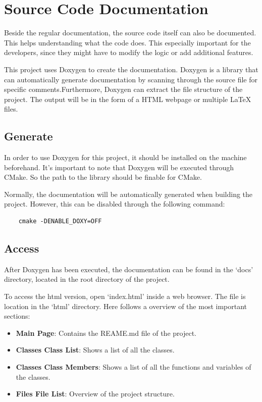 \documentclass[]{article}
\begin{document}
\section{Source Code Documentation}
Beside the regular documentation, the source code itself can also be documented. This helps understanding what the code does. This especially important for the developers, since they might have to modify the logic or add additional features.

This project uses Doxygen to create the documentation. Doxygen is a library that can automatically generate documentation by scanning through the source file for specific comments.Furthermore, Doxygen can extract the file structure of the project. The output will be in the form of a HTML webpage or multiple LaTeX files. 


\subsection{Generate}
In order to use Doxygen for this project, it should be installed on the machine beforehand. It’s important to note that Doxygen will be executed through CMake. So the path to the library should be finable for CMake.

Normally, the documentation will be automatically generated when building the project. However, this can be disabled through the following command:
\begin{verbatim}
	cmake -DENABLE_DOXY=OFF
\end{verbatim}


\subsection{Access}
After Doxygen has been executed, the documentation can be found in the ‘docs’ directory, located in the root directory of the project.

To access the html version, open ‘index.html’ inside a web browser. The file is location in the ‘html’ directory. Here follows a overview of the most important sections:
\begin{itemize}
	\itemsep 0em
	\item \textbf{Main Page}: Contains the REAME.md file of the project.
	\item \textbf{Classes \textrangle{} Class List}: Shows a list of all the classes.
	\item \textbf{Classes \textrangle{} Class Members}: Shows a list of all the functions and variables of the classes.
	\item \textbf{Files \textrangle{} File List}: Overview of the project structure.
\end{itemize}
\end{document}
